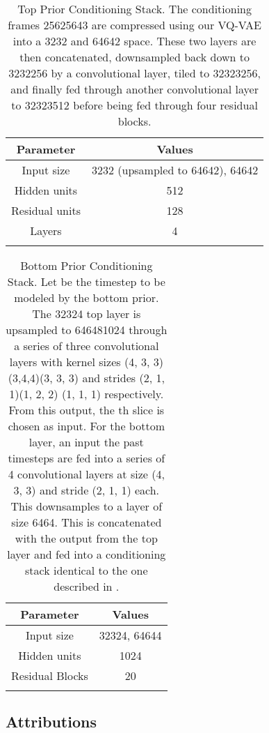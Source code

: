 \documentclass{article}
\begin{document}
\begin{table}[t]
  \centering
  \begin{tabular}{cc}
    \toprule
    Parameter     & Values \\
    \midrule
Input size & 3232 (upsampled to 64642), 64642 \\
Hidden units & 512  \\
Residual units & 128 \\
Layers & 4 \\
\bottomrule
\\
  \end{tabular}
  \caption{Top Prior Conditioning Stack. The conditioning frames 25625643 are compressed using our VQ-VAE into a 3232 and 64642 space. These two layers are then concatenated, downsampled back down to 3232256 by a convolutional layer, tiled to 32323256, and finally fed through another convolutional layer to 32323512 before being fed through four residual blocks.}
\end{table}

\begin{table}[t!]
  \centering
  \begin{tabular}{cc}
    \toprule
    Parameter     & Values \\
    \midrule
Input size & 32324, 64644 \\
Hidden units & 1024  \\
Residual Blocks & 20 \\
\bottomrule
\\
  \end{tabular}
  \caption{Bottom Prior Conditioning Stack. Let  be the timestep to be modeled by the bottom prior. The 32324 top layer is upsampled to 646481024 through a series of three convolutional layers with kernel sizes (4, 3, 3)(3,4,4)(3, 3, 3) and strides (2, 1, 1)(1, 2, 2)	(1, 1, 1) respectively. From this output, the th slice is chosen as input. For the bottom layer, an input the past  timesteps are fed into a series of 4 convolutional layers at size (4, 3, 3) and stride (2, 1, 1) each. This downsamples to a layer of size 6464. This is concatenated with the output from the top layer and fed into a conditioning stack identical to the one described in \cite{RazaviOV19}. }
\end{table}

\clearpage

\subsection{Attributions} \label{Attributions}
\end{document}
